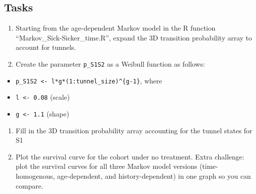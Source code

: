 \documentclass[
]{article}
\providecommand{\tightlist}{%
  \setlength{\itemsep}{0pt}\setlength{\parskip}{0pt}}
\begin{document}
\hypertarget{tasks}{%
\subsection{Tasks}\label{tasks}}

\begin{enumerate}
\def\labelenumi{\arabic{enumi}.}
\item
  Starting from the age-dependent Markov model in the R function
  ``Markov\_Sick-Sicker\_time.R'', expand the 3D transition probability
  array to account for tunnels.
\item
  Create the parameter \texttt{p\_S1S2} as a Weibull function as
  follows:
\end{enumerate}

\begin{itemize}
\tightlist
\item
  \texttt{p\_S1S2\ \textless{}-\ l*g*(1:tunnel\_size)\^{}\{g-1\}}, where
\item
  \texttt{l\ \textless{}-\ 0.08} (scale)
\item
  \texttt{g\ \textless{}-\ 1.1} (shape)
\end{itemize}

\begin{enumerate}
\def\labelenumi{\arabic{enumi}.}
\setcounter{enumi}{2}
\item
  Fill in the 3D transition probability array accounting for the tunnel
  states for S1
\item
  Plot the survival curve for the cohort under no treatment. Extra
  challenge: plot the survival curves for all three Markov model
  versions (time-homogenous, age-dependent, and history-dependent) in
  one graph so you can compare.
\end{enumerate}
\end{document}
